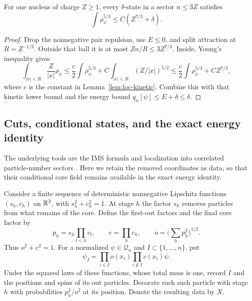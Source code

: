 \begin{lemma}
\label{lem:atomic-global-density}
For one nucleus of charge $Z\ge1$, every $\delta$-state in a sector
$n\le3Z$ satisfies
\begin{equation}\label{eq:atomic-global-density}
 \int\rho_\psi^{5/3}\le C(Z^{7/3}+\delta).
\end{equation}
\end{lemma}
\begin{proof}
Drop the nonnegative pair repulsion, use $E\le0$, and split attraction
at $R=Z^{-1/3}$. Outside that ball it is at most $Zn/R\le3Z^{7/3}$.
Inside, Young's inequality gives
\[
 \int_{|x|<R}\frac Z{|x|}\rho_\psi
 \le\frac c2\int\rho_\psi^{5/3}
       +C\int_{|x|<R}(Z/|x|)^{5/2}
 \le\frac c2\int\rho_\psi^{5/3}+CZ^{7/3},
\]
where $c$ is the constant in Lemma~\ref{lem:loc-kinetic}.
Combine this with that kinetic lower bound and the energy bound
$q_n[\psi]\le E+\delta\le\delta$.
\end{proof}

\subsection{Cuts, conditional states, and the exact energy identity}

The underlying tools are the IMS formula
\citep[Lemma~2.4]{Solovej2003} and localization into correlated
particle-number sectors \citep[Proposition~3.1 and Example~3.3]{Lewin2011Geometric}.
Here we retain the removed coordinates as data, so that their conditional
core field remains available in the exact energy identity.

Consider a finite sequence of deterministic nonnegative Lipschitz
functions $(s_h,c_h)$ on $\mathbb R^3$, with $s_h^2+c_h^2=1$.  At stage $h$
the factor $s_h$ removes particles from what remains of the core.
Define the first-out factors and the final core factor by
\begin{equation}\label{eq:loc-first-out}
 p_h=s_h\prod_{l<h}c_l,\qquad c=\prod_hc_h,
 \qquad o=\Big(\sum_hp_h^2\Big)^{1/2}.
\end{equation}
Thus $o^2+c^2=1$.  For a normalized $\psi\in\mathcal Q_n$ and
$I\subset\{1,\ldots,n\}$, put
\[
 \psi_I=\prod_{i\in I}o(x_i)\prod_{i\notin I}c(x_i)\psi.
\]
Under the squared laws of these functions, whose total mass is one,
record $I$ and the positions and spins of its out particles.  Decorate
each such particle with stage $h$ with probabilities $p_h^2/o^2$ at
its position.  Denote the resulting data by $X$.

